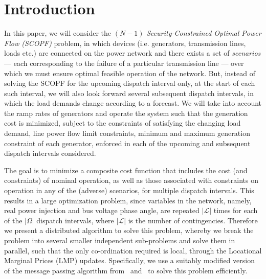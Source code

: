 \documentclass[preprint,12pt,3p]{elsarticle}
\begin{document}
\section{Introduction}
% 
% 
% 
% 
\noindent In this paper, we will consider the $(N-1)$ \emph{Security-Constrained Optimal Power Flow (SCOPF)} problem, in which devices (i.e. generators, transmission lines, loads etc.) are connected on the power network and there exists a set of \emph{scenarios} --- each corresponding to the failure of a particular transmission line --- over which we must ensure optimal feasible operation of the network. But, instead of solving the SCOPF for the upcoming dispatch interval only, at the start of each such interval, we will also look forward several subsequent dispatch intervals, in which the load demands change according to a forecast. We will take into account the ramp rates of generators and operate the system such that the generation cost is minimized, subject to the constraints of satisfying the changing load demand, line power flow limit constraints, minimum and maximum generation constraint of each generator, enforced in each of the upcoming and subsequent dispatch intervals considered.

The goal is to minimize a composite cost function that includes the cost (and constraints) of nominal operation, as well as those associated with constraints on operation in any of the (adverse) scenarios, for multiple dispatch intervals. This results in a large optimization problem, since variables in the network, namely, real power injection and bus voltage phase angle, are repeated $|\mathcal{L}|$ times for each of the $|\Omega|$ dispatch intervals, where $|\mathcal{L}|$ is the number of contingencies. Therefore we present a distributed algorithm to solve this problem, whereby we break the problem into several smaller independent sub-problems and solve them in parallel, such that the only co-ordination required is local, through the Locational Marginal Prices (LMP) updates. Specifically, we use a suitably modified version of the message passing algorithm from~\cite{KC:13} and~\cite{CK:14} to solve this problem efficiently.
\end{document}
